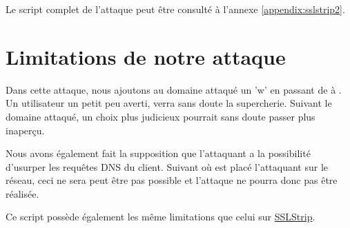 Le script complet de l'attaque peut être consulté à l'annexe \ref{appendix:sslstrip2}.

\section{Limitations de notre attaque}

Dans cette attaque, nous ajoutons au domaine attaqué un 'w' en passant de  à . Un utilisateur un petit peu averti, verra sans doute la supercherie. Suivant le domaine attaqué, un choix plus judicieux pourrait sans doute passer plus inaperçu.

Nous avons également fait la supposition que l'attaquant a la possibilité d'usurper les requêtes DNS du client. Suivant où est placé l'attaquant sur le réseau, ceci ne sera peut être pas possible et l'attaque ne pourra donc pas être réalisée.

Ce script possède également les même limitations que celui sur \hyperref[sec:sslstrip]{SSLStrip}.
